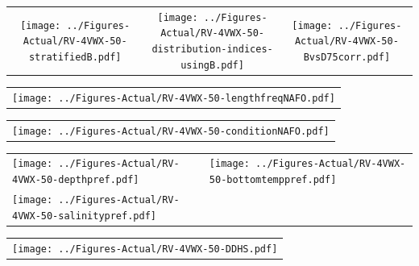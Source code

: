 \documentclass[12pt]{article}\usepackage[]{graphicx}\usepackage[]{color}
\begin{document}
\vspace{1cm}
\begin{minipage}{1.0\textwidth}
 \begin{tabular}{ccc}
\texttt{[image: ../Figures-Actual/RV-4VWX-50-stratifiedB.pdf]} & 
\texttt{[image: ../Figures-Actual/RV-4VWX-50-distribution-indices-usingB.pdf]} & 
\texttt{[image: ../Figures-Actual/RV-4VWX-50-BvsD75corr.pdf]} \\ 
\end{tabular} 
\end{minipage}
\clearpage
\begin{minipage}{1.0\textwidth}
 \begin{tabular}{c}
\texttt{[image: ../Figures-Actual/RV-4VWX-50-lengthfreqNAFO.pdf]} \\ 
\end{tabular} 
\end{minipage}
\newline

\vspace{1cm}
\begin{minipage}{1.0\textwidth}
 \begin{tabular}{c}
\texttt{[image: ../Figures-Actual/RV-4VWX-50-conditionNAFO.pdf]} \\ 
\end{tabular} 
\end{minipage}
\clearpage
\begin{minipage}{1.0\textwidth}
 \begin{tabular}[t]{m{3in}m{3in}}
\texttt{[image: ../Figures-Actual/RV-4VWX-50-depthpref.pdf]} & 
\texttt{[image: ../Figures-Actual/RV-4VWX-50-bottomtemppref.pdf]} \\ 
\texttt{[image: ../Figures-Actual/RV-4VWX-50-salinitypref.pdf]} & 
 \\ 
\end{tabular} 
\end{minipage}
\newline

\vspace{1cm}
\begin{minipage}{1.0\textwidth}
 \begin{tabular}{c}
\texttt{[image: ../Figures-Actual/RV-4VWX-50-DDHS.pdf]} \\ 
\end{tabular} 
\end{minipage}
\clearpage
\end{document}
